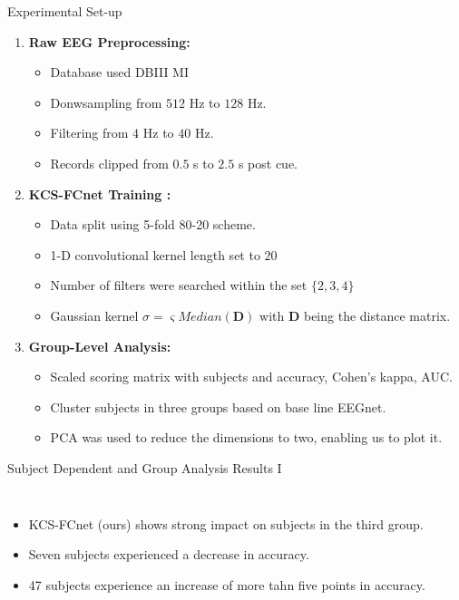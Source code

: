 \documentclass[aspectratio=169]{beamer}
\let\oldcite\cite %
\renewcommand{\cite}[1]{{\tiny\oldcite{#1}}}
\newcommand{\mat}[1]{\bm {#1}}
\begin{document}
\begin{frame}{Experimental Set-up}
    \begin{enumerate}
        \item \textbf{Raw EEG Preprocessing:} 
        \begin{itemize}
            \item Database used DBIII MI
            \item Donwsampling from $512$ Hz to $128$ Hz. 
            \item Filtering from $4$ Hz to $40$ Hz. 
            \item Records clipped from $0.5$ s to $2.5$ s post cue.
        \end{itemize}
        \item \textbf{KCS-FCnet Training \cite{lawhern2018eegnet, schirrmeister2017deep}:}
        \begin{itemize}
            \item Data split using 5-fold 80-20 scheme.
            \item 1-D convolutional kernel length set to $20$
            \item Number of filters were searched within the set $\{2,3,4\}$
            \item Gaussian kernel $\sigma=\varsigma  Median( \mat{D} ) $ with $\mat{D}$ being the distance matrix. 
        \end{itemize}
        \item \textbf{Group-Level Analysis:}
        \begin{itemize}
            \item Scaled scoring matrix with subjects and accuracy, Cohen's kappa, AUC.
            \item Cluster subjects in three groups based on base line EEGnet.
            \item PCA was used to reduce the dimensions to two, enabling us to plot it.
        \end{itemize}
    \end{enumerate}
\end{frame}

\begin{frame}{Subject Dependent and Group Analysis Results I}
    \begin{columns}
            \centering
            \resizebox{1\linewidth}{!}{}
        \begin{itemize}
            \item KCS-FCnet (ours) shows strong impact on subjects in the third group.
            \item Seven subjects experienced a decrease in accuracy.
            \item 47 subjects experience an increase of more tahn five points in accuracy.
        \end{itemize}
    \end{columns}

\end{frame}
\end{document}
